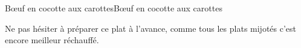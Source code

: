 \begin{recette}{Bœuf en cocotte aux carottes}{Bœuf en cocotte aux carottes}
\begin{conseils}
Ne pas hésiter à préparer ce plat à l'avance, comme tous les plats mijotés c'est encore meilleur réchauffé.
\end{conseils}

\end{recette}